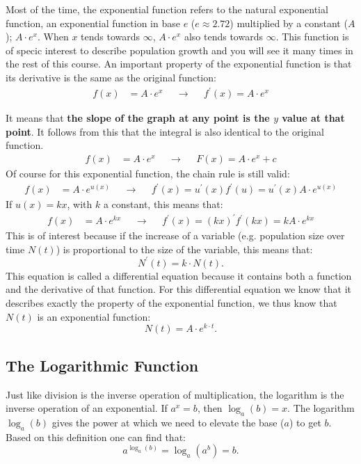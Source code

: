 \documentclass[a4paper]{report}
\begin{document}
Most of the time, the exponential function refers to the natural exponential function, an exponential function in base $e$ ($e \approx 2.72$) multiplied by a constant ($A$); $A \cdot e^x$. When $x$ tends towards $\infty$, $A \cdot e^x$ also tends towards $\infty$. This function is of specic interest to describe population growth and you will see it many times in the rest of this course. An important property of the exponential function is that its derivative is the same as the original function:
\begin{align}
f(x)& = A \cdot e^x & &\rightarrow& & f^\prime(x) =  A \cdot e^x  
\end{align}

It means that \textbf{the slope of the graph at any point is the $y$ value at that
point}. It follows from this that the integral is also identical to the original function.
\begin{align}
f(x)& = A \cdot e^x & &\rightarrow& &F(x) =  A \cdot e^x  + c
\end{align}
Of course for this exponential function, the chain rule is still valid:
\begin{align}
f(x)& = A \cdot e^{u(x)} & &\rightarrow& & f^\prime(x) = u^\prime(x)f^\prime(u) = u^\prime(x)A \cdot e^{u(x)} 
\end{align}
If $u(x)=kx$, with $k$ a constant, this means that:
\begin{align}
f(x)& = A \cdot e^{kx} & &\rightarrow& & f^\prime(x) = (kx)^\prime f^\prime(kx) = kA \cdot e^{kx} 
\end{align}
This is of interest because if the increase of a variable (e.g. population size over time $N(t)$) is proportional to the size of the variable, this means that:
\begin{equation}
N^\prime(t)=k \cdot N(t).
\end{equation}
This equation is called a differential equation because it contains both a function and the derivative of that function. For this differential equation we know that it describes exactly the property of the exponential function, we thus know that $N(t)$ is an exponential function:
\begin{equation}
N(t)=A \cdot e^{k \cdot t}.
\end{equation}

\subsection{The Logarithmic Function}
Just like division is the inverse operation of multiplication, the logarithm is the inverse operation of an exponential. If $a^x=b$, then $\log_a(b)=x$. The logarithm $\log_a(b)$ gives the power at which we need to elevate the base ($a$) to get $b$. Based on this definition one can find that:
\begin{equation*}
a^{\log_a(b)} = \log_a(a^b) = b.
\end{equation*}
\end{document}

